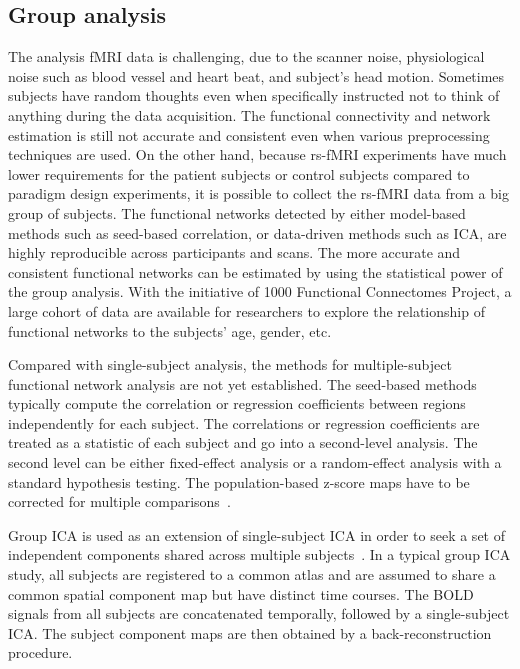\subsection{Group analysis}

The analysis fMRI data is challenging, due to the scanner noise, physiological
noise such as blood vessel and heart beat, and subject's head motion. Sometimes
subjects have random thoughts even when specifically instructed not to think of 
anything  during the data acquisition. The functional connectivity and
network estimation is still not accurate and consistent even when various
preprocessing techniques are used. On the other hand, because rs-fMRI
experiments have much lower requirements for the patient subjects or control
subjects compared to paradigm design experiments, it is possible to collect the
rs-fMRI data from a big group of subjects. The functional networks detected by
either model-based methods such as seed-based correlation, or data-driven
methods such as ICA, are highly reproducible across participants and scans. The
more accurate and consistent functional networks can be estimated by using the
statistical power of the group analysis. With the initiative of 1000 Functional
Connectomes Project, a large cohort of data are available for researchers to
explore the relationship of functional networks to the subjects' age, gender, etc.

Compared with single-subject analysis, the methods for multiple-subject
functional network analysis are not yet established. The seed-based methods
typically compute the correlation or regression coefficients between regions
independently for each subject. The correlations or regression coefficients are
treated as a statistic of each subject and go into a second-level
analysis. The second level can be either fixed-effect analysis or a
random-effect analysis with a standard hypothesis testing. The population-based
z-score maps have to be corrected for multiple comparisons~\cite{fox2005human}.

Group ICA is used as an extension of single-subject ICA in order to seek a set
of independent components shared across multiple
subjects~\cite{calhoun2001spatial}. In a typical group ICA study, all subjects
are registered to a common atlas and are assumed to share a common spatial
component map but have distinct time courses. The BOLD signals from all subjects
are concatenated temporally, followed by a single-subject ICA. The subject
component maps are then obtained by a back-reconstruction procedure.

